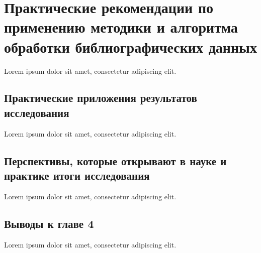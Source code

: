 \chapter{Практические рекомендации по применению методики и алгоритма обработки библиографических данных}
Lorem ipsum dolor sit amet, consectetur adipiscing elit.

\section{Практические приложения результатов исследования}
Lorem ipsum dolor sit amet, consectetur adipiscing elit.

\section{Перспективы, которые открывают в науке и практике итоги исследования}
Lorem ipsum dolor sit amet, consectetur adipiscing elit.

\section*{Выводы к главе 4}
Lorem ipsum dolor sit amet, consectetur adipiscing elit.
